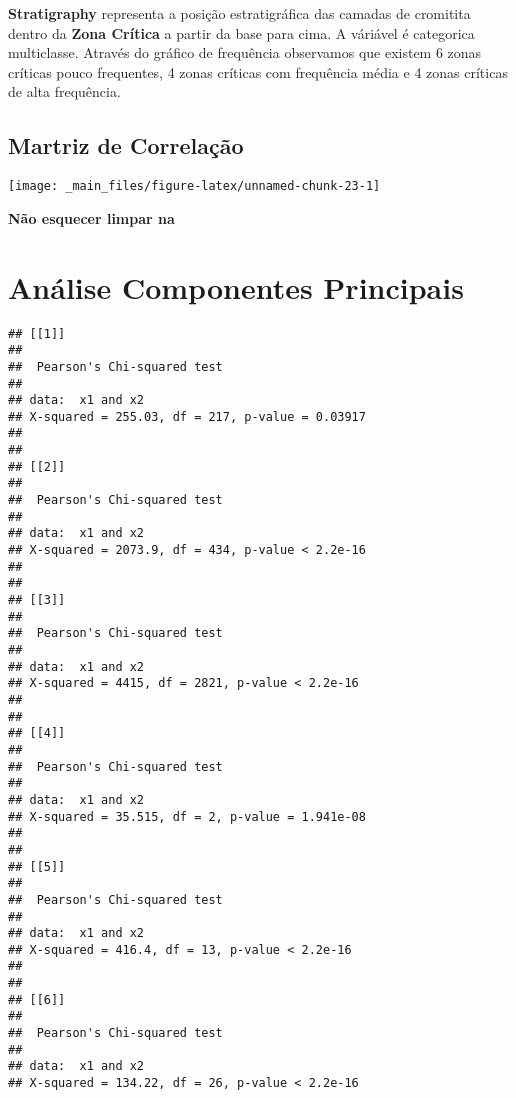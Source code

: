 \documentclass[
]{article}
\begin{document}
\textbf{Stratigraphy} representa a posição estratigráfica das camadas de cromitita dentro da \textbf{Zona Crítica} a partir da base para cima. A váriável é categorica multiclasse. Através do gráfico de frequência observamos que existem 6 zonas críticas pouco frequentes, 4 zonas críticas com frequência média e 4 zonas críticas de alta frequência.

\hypertarget{martriz-de-correlauxe7uxe3o}{%
\subsection{Martriz de Correlação}\label{martriz-de-correlauxe7uxe3o}}

\begin{center}\texttt{[image: \_main\_files/figure-latex/unnamed-chunk-23-1]} \end{center}

\textbf{Não esquecer limpar na}

\newpage

\hypertarget{anuxe1lise-componentes-principais}{%
\section{Análise Componentes Principais}\label{anuxe1lise-componentes-principais}}

\begin{verbatim}
## [[1]]
## 
##  Pearson's Chi-squared test
## 
## data:  x1 and x2
## X-squared = 255.03, df = 217, p-value = 0.03917
## 
## 
## [[2]]
## 
##  Pearson's Chi-squared test
## 
## data:  x1 and x2
## X-squared = 2073.9, df = 434, p-value < 2.2e-16
## 
## 
## [[3]]
## 
##  Pearson's Chi-squared test
## 
## data:  x1 and x2
## X-squared = 4415, df = 2821, p-value < 2.2e-16
## 
## 
## [[4]]
## 
##  Pearson's Chi-squared test
## 
## data:  x1 and x2
## X-squared = 35.515, df = 2, p-value = 1.941e-08
## 
## 
## [[5]]
## 
##  Pearson's Chi-squared test
## 
## data:  x1 and x2
## X-squared = 416.4, df = 13, p-value < 2.2e-16
## 
## 
## [[6]]
## 
##  Pearson's Chi-squared test
## 
## data:  x1 and x2
## X-squared = 134.22, df = 26, p-value < 2.2e-16
\end{verbatim}
\end{document}
